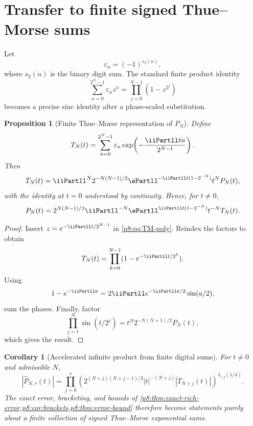 \documentclass[11pt]{article}
\numberwithin{equation}{section}
\newtheorem{proposition}[theorem]{Proposition}
\newtheorem{corollary}[theorem]{Corollary}
\theoremstyle{definition}
\theoremstyle{remark}
\begin{document}
\section{Transfer to finite signed Thue--Morse sums}
\label{p8:sec:thue-morse-transfer}

Let
\begin{equation}
\varepsilon_n=(-1)^{s_2(n)},
\label{p8:eq:epsilon}
\end{equation}
where $s_2(n)$ is the binary digit sum. The standard finite product identity
\begin{equation}
\sum_{n=0}^{2^N-1}\varepsilon_n z^n
=\prod_{j=0}^{N-1}(1-z^{2^j})
\label{p8:eq:TM-poly}
\end{equation}
becomes a precise sinc identity after a phase-scaled substitution.

\begin{proposition}[Finite Thue--Morse representation of $P_N$]
\label{p8:prop:TM-PN}
Define
\begin{equation}
T_N(t)=\sum_{n=0}^{2^N-1}\varepsilon_n
\exp\!\left(-\frac{\iiPartll tn}{2^{N-1}}\right).
\label{p8:eq:TN}
\end{equation}
Then
\begin{equation}
T_N(t)=\iiPartll^N2^{-N(N-1)/2}
\ePartll^{-\iiPartll t(1-2^{-N})}t^N P_N(t),
\label{p8:eq:TN-PN}
\end{equation}
with the identity at $t=0$ understood by continuity. Hence, for $t\ne0$,
\begin{equation}
P_N(t)=2^{N(N-1)/2}\iiPartll^{-N}
\ePartll^{\iiPartll t(1-2^{-N})}t^{-N}T_N(t).
\label{p8:eq:PN-TN}
\end{equation}
\end{proposition}

\begin{proof}
Insert $z=e^{-\iiPartll t/2^{N-1}}$ in \cref{p8:eq:TM-poly}. Reindex the factors to obtain
\[
T_N(t)=\prod_{k=0}^{N-1}(1-e^{-\iiPartll t/2^k}).
\]
Using
\[
1-e^{-\iiPartll a}=2\iiPartll e^{-\iiPartll a/2}\sin(a/2),
\]
sum the phases.  Finally, factor
\[
\prod_{j=1}^{N}\sin(t/2^j)
=t^N2^{-N(N+1)/2}P_N(t),
\]
which gives the result.
\end{proof}

\begin{corollary}[Accelerated infinite product from finite digital sums]
\label{p8:cor:TM-accelerated}
For $t\ne0$ and admissible $N$,
\begin{equation}
|\widehat P_{N,r}(t)|
=\prod_{j=0}^{r}
\left(
2^{(N+j)(N+j-1)/2}|t|^{-(N+j)}|T_{N+j}(t)|
\right)^{\lambda_{r,j}(1/4)}.
\label{p8:eq:TM-accelerated}
\end{equation}
The exact error, bracketing, and bounds of \cref{p8:thm:exact-rich-error,p8:cor:brackets,p8:thm:error-bound} therefore become statements purely about a finite collection of signed Thue--Morse exponential sums.
\end{corollary}
\end{document}
